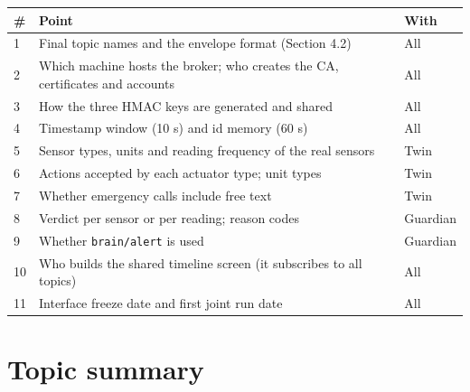 \documentclass[11pt,a4paper]{article}
\newcommand{\code}[1]{\texttt{#1}}
\begin{document}
\begin{tabularx}{\linewidth}{@{}l Y l@{}}
\toprule
\textbf{\#} & \textbf{Point} & \textbf{With} \\
 & Final topic names and the envelope format (Section 4.2) & All \\
2 & Which machine hosts the broker; who creates the CA, certificates and accounts & All \\
3 & How the three HMAC keys are generated and shared & All \\
4 & Timestamp window (10 s) and id memory (60 s) & All \\
5 & Sensor types, units and reading frequency of the real sensors & Twin \\
6 & Actions accepted by each actuator type; unit types & Twin \\
7 & Whether emergency calls include free text & Twin \\
8 & Verdict per sensor or per reading; reason codes & Guardian \\
9 & Whether \code{brain/alert} is used & Guardian \\
10 & Who builds the shared timeline screen (it subscribes to all topics) & All \\
11 & Interface freeze date and first joint run date & All \\
\bottomrule
\end{tabularx}

\appendix
\section{Topic summary}
\label{annex:topics}
\end{document}

